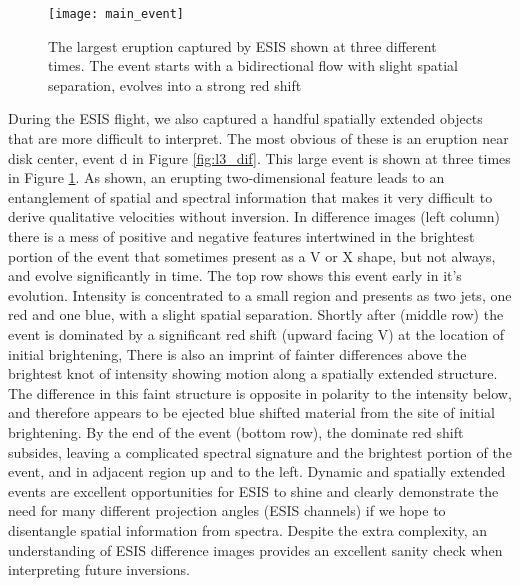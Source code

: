     	
    	\begin{figure}[htb!]
    		\texttt{[image: main\_event]}
    		\centering
    		\caption{The largest eruption captured by ESIS shown at three different times. The event starts with a bidirectional flow with slight spatial separation, evolves into a strong red shift }
    		\label{fig:main_event}
    	\end{figure}
		
    	During the ESIS flight, we also captured a handful spatially extended objects that are more difficult to interpret.
    	The most obvious of these is an eruption near disk center, event d in Figure \ref{fig:l3_dif}.
    	This large event is shown at three times in Figure \ref{fig:main_event}.
    	As shown, an erupting two-dimensional feature leads to an entanglement of spatial and spectral information that makes it very difficult to derive qualitative velocities without inversion.
    	In difference images (left column) there is a mess of positive and negative features intertwined in the brightest portion of the event that sometimes present as a V or X shape, but not always, and evolve significantly in time.
    	The top row shows this event early in it's evolution. 
    	Intensity is concentrated to a small region and presents as two jets, one red and one blue, with a slight spatial separation.
    	Shortly after (middle row) the event is dominated by a significant red shift (upward facing V) at the location of initial brightening, 
    	There is also an imprint of fainter differences above the brightest knot of intensity showing motion along a spatially extended structure.
    	The difference in this faint structure is opposite in polarity to the intensity below, and therefore appears to be ejected blue shifted material from the site of initial brightening.
    	By the end of the event (bottom row), the dominate red shift subsides, leaving a complicated spectral signature and the brightest portion of the event, and in adjacent region up and to the left.  
    	Dynamic and spatially extended events are excellent opportunities for ESIS to shine and clearly demonstrate the need for many different projection angles (ESIS channels) if we hope to disentangle spatial information from spectra.
    	Despite the extra complexity, an understanding of ESIS difference images provides an excellent sanity check when interpreting future inversions.
    	
